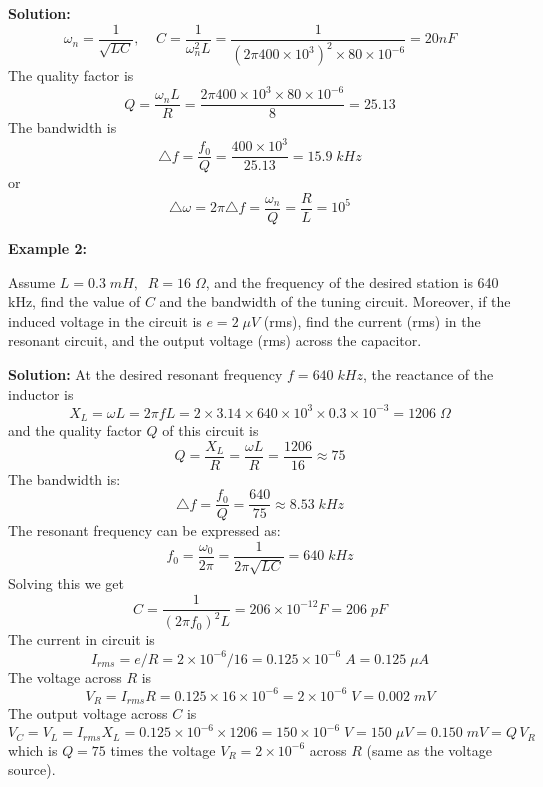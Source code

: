 \documentclass{article}
\begin{document}
{\bf Solution:}
\begin{equation}
  \omega_n=\frac{1}{\sqrt{LC}},\;\;\;\;
  C=\frac{1}{\omega_n^2 L}=\frac{1}{(2\pi 400\times 10^3)^2\times 80\times 10^{-6}}
=20nF	
\end{equation}
The quality factor is
\begin{equation}
  Q=\frac{\omega_n L}{R}=\frac{2\pi 400\times 10^3\times 80\times 10^{-6}}{8}=25.13
\end{equation}
The bandwidth is
\begin{equation} 
  \triangle f=\frac{f_0}{Q}=\frac{400\times 10^3}{25.13}=15.9\;kHz
\end{equation}
or 
\begin{equation} 
  \triangle \omega= 2\pi\triangle f=\frac{\omega_n}{Q}=\frac{R}{L}=10^5 
\end{equation}

{\bf Example 2:} 

Assume $L=0.3\; mH,\;\;R=16\;\Omega$, and the frequency of the desired 
station is 640 kHz, find the value of $C$ and the bandwidth of the tuning 
circuit. Moreover, if the induced voltage in the circuit is $e=2\;\mu V$
(rms), find the current (rms) in the resonant circuit, and the output 
voltage (rms) across the capacitor.

{\bf Solution:} At the desired resonant frequency $f=640\;kHz$, the 
reactance of the inductor is
\begin{equation}
  X_L=\omega L=2\pi f L
  =2\times 3.14\times 640\times 10^3\times 0.3\times 10^{-3}=1206\;\Omega 
\end{equation}
and the quality factor $Q$ of this circuit is 
\begin{equation}
  Q=\frac{X_L}{R}=\frac{\omega L}{R}=\frac{1206}{16}\approx 75
\end{equation}
The bandwidth is:
\begin{equation}
  \triangle f =\frac{f_0}{Q}=\frac{640}{75}\approx 8.53\;kHz 
\end{equation}
The resonant frequency can be expressed as:
\begin{equation}
  f_0=\frac{\omega_0}{2\pi}=\frac{1}{2\pi\sqrt{LC}}=640\;kHz	
\end{equation}
Solving this we get
\begin{equation}
  C=\frac{1}{(2\pi f_0)^2L}=206\times 10^{-12}F=206\;pF	
\end{equation}
The current in circuit is
\begin{equation}
  I_{rms}=e/R=2\times 10^{-6}/16=0.125\times 10^{-6}\; A =0.125\;\mu A
\end{equation}
The voltage across $R$ is
\begin{equation}
  V_R=I_{rms} R=0.125\times 16\times 10^{-6}=2\times 10^{-6}\;V=0.002\;mV
\end{equation}
The output voltage across $C$ is
\begin{equation}
  V_C = V_L=I_{rms} X_L=0.125\times 10^{-6}\times 1206=150\times 10^{-6}\;V
  =150\;\mu V =0.150\;mV=Q\,V_R
\end{equation}
which is $Q=75$ times the voltage $V_R=2\times 10^{-6}$ across $R$ 
(same as the voltage source).
\end{document}
